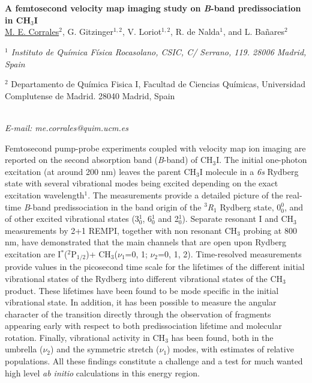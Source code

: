 \section*{}
\begin{center}
{\bf \Large
A femtosecond velocity map imaging study on \textit{B}-band predissociation in CH$_3$I
}
\\
\vspace{0.5cm}
\underline{M. E. Corrales}$^{2}$, G. Gitzinger$^{1,2}$, V. Loriot$^{1,2}$, R. de Nalda$^{1}$, and L. Bañares$^{2}$
\\
\vspace{0.5cm}
{\it
$^{1}$ Instituto de Química Física Rocasolano, CSIC, C/ Serrano, 119. 28006 Madrid, Spain

$^{2}$ Departamento de Química Fisica I, Facultad de Ciencias Químicas, Universidad Complutense de
Madrid. 28040 Madrid, Spain
}
\\
\vspace{0.5cm}
{\it E-mail: me.corrales@quim.ucm.es}
\\
\vspace{0.5cm}
\end{center}
Femtosecond pump-probe experiments coupled with velocity map ion imaging are reported on the second absorption band (\textit{B}-band) of CH$_3$I. The initial one-photon excitation (at around 200 nm) leaves the parent CH$_3$I molecule in a \textit{6s} Rydberg state with several vibrational modes being excited depending on the exact excitation wavelength$^{1}$. The measurements provide a detailed picture of the real-time \textit{B}-band predissociation in the band origin of the $^{3}$\textit{R}$_{1}$ Rydberg state, 0$_{0}^{0}$, and of other excited vibrational states (3$_{0}^{1}$, 6$_{0}^{1}$ and 2$_{0}^{1}$). Separate resonant I and CH$_3$ measurements by 2+1 REMPI, together with non resonant CH$_3$ probing at 800 nm, have demonstrated that the main channels that are open upon Rydberg excitation are I$^{*}$($^{2}$P$_{1/2}$)+ CH$_3$($\nu _1$=0, 1; $\nu _2$=0, 1, 2). Time-resolved measurements provide values in the picosecond time scale for the lifetimes of the different initial vibrational states of the Rydberg into different vibrational states of the CH$_3$ product. These lifetimes have been found to be mode specific in the initial vibrational state. In addition, it has been possible to measure the angular character of the transition directly through the observation of fragments appearing early with respect to both predissociation lifetime and molecular rotation. Finally, vibrational activity in CH$_3$ has been found, both in the umbrella ($\nu _2$) and the symmetric stretch ($\nu _1$) modes, with estimates of relative populations. All these findings constitute a challenge and a test for much wanted high level \textit{ab initio} calculations in this energy region.
